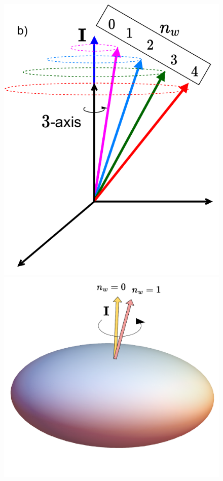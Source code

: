 \documentclass[
	11pt, %
]{beamer}
\begin{document}
\begin{frame}
\begin{figure}
		\includegraphics[scale=0.28]{figures/wobbling_n_schematic-2.pdf}
		\includegraphics[scale=0.18]{figures/triaxial-shapes-even-A.pdf}

\end{figure}
\end{frame}
\end{document}
